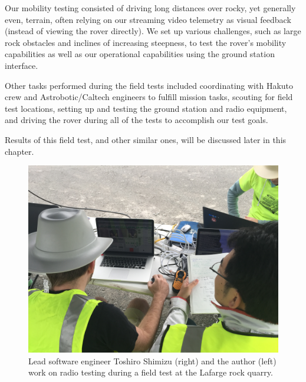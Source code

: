 Our mobility testing consisted of driving long distances over rocky, yet generally even, terrain, often relying on our streaming video telemetry as visual feedback (instead of viewing the rover directly). We set up various challenges, such as large rock obstacles and inclines of increasing steepness, to test the rover's mobility capabilities as well as our operational capabilities using the ground station interface.

Other tasks performed during the field tests included coordinating with Hakuto crew and Astrobotic/Caltech engineers to fulfill mission tasks, scouting for field test locations, setting up and testing the ground station and radio equipment, and driving the rover during all of the tests to accomplish our test goals.

Results of this field test, and other similar ones, will be discussed later in this chapter.

\begin{figure}[h]
\centering
    \includegraphics[width=\columnwidth]{images/daytime_operation_pittsburgh_field_test.jpg}
    \caption{Lead software engineer Toshiro Shimizu (right) and the author (left) work on radio testing during a field test at the Lafarge rock quarry.}
    \label{fig:daytime_operation_pittsburgh_field_test}
\end{figure}


